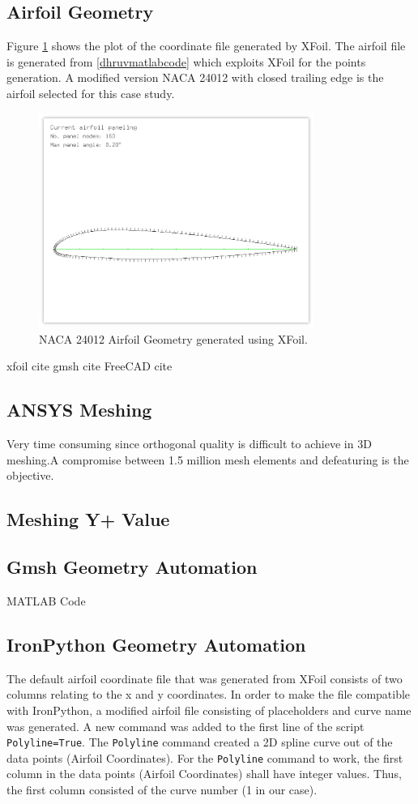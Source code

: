 \documentclass[english]{kththesis}
\begin{document}
\subsection{Airfoil Geometry} \label{subsec:airfoil_geometry}
Figure \ref{fig:xfoil2} shows the plot of the coordinate file generated by XFoil.
The airfoil file is generated from \ref{dhruvmatlabcode} which exploits XFoil for the points generation. A modified version NACA 24012 with closed trailing edge is the airfoil selected for this case study. 
\begin{figure}[!htb]
    \centering
    \includegraphics[width=0.8\textwidth]{IPS/xfoil2.png}
    \caption{NACA 24012 Airfoil Geometry generated using XFoil.}
    \label{fig:xfoil2}
\end{figure}
xfoil cite\cite{xfoil}
gmsh cite\cite{gmsh}
FreeCAD cite
\subsection{ANSYS Meshing}
Very time consuming since orthogonal quality is difficult to achieve in 3D meshing.A compromise between 1.5 million mesh elements and defeaturing is the objective.
\subsection{Meshing Y+ Value}
\subsection{Gmsh Geometry Automation} \label{subsec:gmsh_geometry}
MATLAB Code
\subsection{IronPython Geometry Automation} \label{subsec:ironpython_geometry}
The default airfoil coordinate file that was generated from XFoil consists of two columns relating to the x and y coordinates. In order to make the file compatible with IronPython, a modified airfoil file consisting of placeholders and curve name was generated. A new command was added to the first line of the script \lstinline{Polyline=True}. The \lstinline{Polyline} command created a 2D spline curve out of the data points (Airfoil Coordinates). For the \lstinline{Polyline} command to work, the first column in the data points (Airfoil Coordinates) shall have integer values. Thus, the first column consisted of the curve number (1 in our case).
\end{document}
